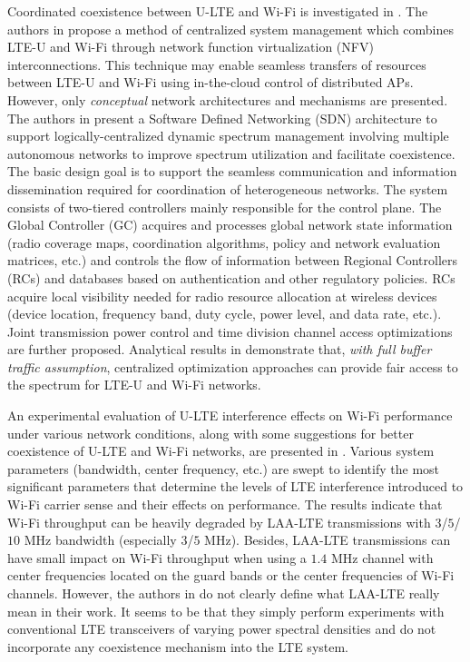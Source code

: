 Coordinated coexistence between U-LTE and Wi-Fi is investigated in \cite{U-LTE-5G-2015, Coordinated-LTE-U-Wi-Fi-2015}. The authors in \cite{U-LTE-5G-2015} propose a method of centralized system management which combines LTE-U and Wi-Fi through network function virtualization (NFV) interconnections. This technique may enable seamless transfers of resources between LTE-U and Wi-Fi using in-the-cloud control of distributed APs. However, only \textit{conceptual} network architectures and mechanisms are presented. The authors in \cite{Coordinated-LTE-U-Wi-Fi-2015} present a Software Defined Networking (SDN) architecture to support logically-centralized dynamic spectrum management involving multiple autonomous networks to improve spectrum utilization and facilitate coexistence. The basic design goal is to support the seamless communication and information dissemination required for coordination of heterogeneous networks. The system consists of two-tiered controllers mainly responsible for the control plane. The Global Controller (GC) acquires and processes global network state information (radio coverage maps, coordination algorithms, policy and network evaluation matrices, etc.) and controls the flow of information between Regional Controllers (RCs) and databases based on authentication and other regulatory policies. RCs acquire local visibility needed for radio resource allocation at wireless devices (device location, frequency band, duty cycle, power level, and data rate, etc.). Joint transmission power control and time division channel access optimizations are further proposed. Analytical results in \cite{Coordinated-LTE-U-Wi-Fi-2015} demonstrate that, \textit{with full buffer traffic assumption}, centralized optimization approaches can provide fair access to the spectrum for LTE-U and Wi-Fi networks.

An experimental evaluation of U-LTE interference effects on Wi-Fi performance under various network conditions, along with some suggestions for better coexistence of U-LTE and Wi-Fi networks, are presented in \cite{LTE-U-Experiment-ICC-WS-2015}. Various system parameters (bandwidth, center frequency, etc.) are swept to identify the most significant parameters that determine the levels of LTE interference introduced to Wi-Fi carrier sense and their effects on performance. The results indicate that Wi-Fi throughput can be heavily degraded by LAA-LTE transmissions with $3$/$5$/$10$ MHz bandwidth (especially $3$/$5$ MHz). Besides, LAA-LTE transmissions can have small impact on Wi-Fi throughput when using a $1.4$ MHz channel with center frequencies located on the guard bands or the center frequencies of Wi-Fi channels. However, the authors in \cite{LTE-U-Experiment-ICC-WS-2015} do not clearly define what LAA-LTE really mean in their work. It seems to be that they simply perform experiments with conventional LTE transceivers of varying power spectral densities and do not incorporate any coexistence mechanism into the LTE system.



